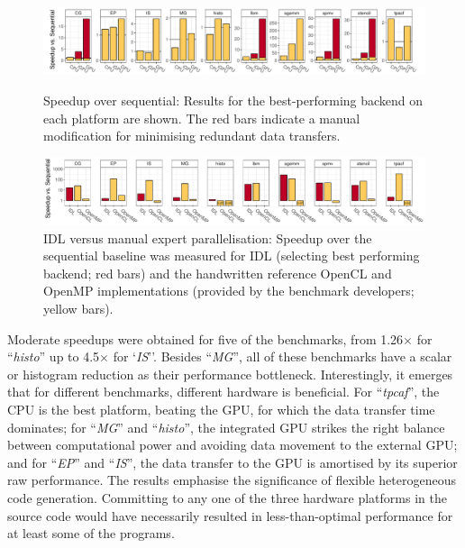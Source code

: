 \begin{figure}[t]
  \centering
  \includegraphics[width=\textwidth]{figures/asplos_speedup.pdf}
  \caption{Speedup over sequential:
           Results for the best-performing backend on each platform are shown.
           The red bars indicate a manual modification for minimising redundant
           data transfers.}
  \label{fig:speedup-figure}
  \vspace{1.5em}
  \centering
  \includegraphics[width=\textwidth]{figures/asplos_comparison.pdf}
  \caption{IDL versus manual expert parallelisation:
           Speedup over the sequential baseline was measured for IDL
           (selecting best performing backend; red bars) and the
           handwritten reference OpenCL and OpenMP implementations
           (provided by the benchmark developers; yellow bars).}
  \label{fig:speedup-figure-2}
  \vspace{0.5em}
\end{figure}

    Moderate speedups were obtained for five of the benchmarks, from
    1.26$\times$ for ``\emph{histo}'' up to 4.5$\times$ for `\emph{IS}''.
    Besides ``\emph{MG}'', all of these benchmarks have a scalar or histogram
    reduction as their performance bottleneck.
    Interestingly, it emerges that for different benchmarks, different hardware
    is beneficial.
    For ``\emph{tpcaf}'', the CPU is the best platform, beating the GPU,
    for which the data transfer time dominates;
    for ``\emph{MG}'' and ``\emph{histo}'', the integrated GPU strikes the right
    balance between computational power and avoiding data movement to the
    external GPU;
    and for ``\emph{EP}'' and ``\emph{IS}'', the data transfer to the GPU is
    amortised by its superior raw performance.
    The results emphasise the significance of flexible heterogeneous
    code generation.
    Committing to any one of the three hardware platforms in the source code
    would have necessarily resulted in less-than-optimal performance for at
    least some of the programs.

